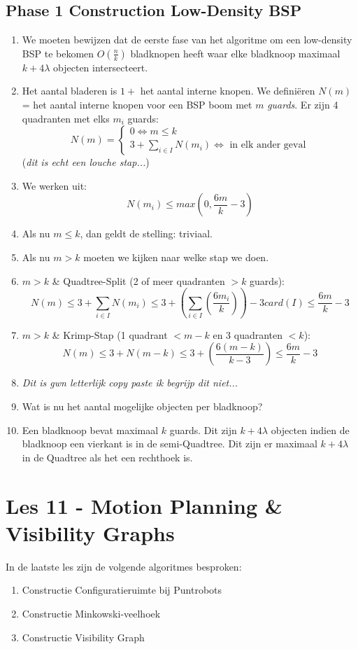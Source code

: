 \documentclass[12pt,a4paper]{article}
\begin{document}
		\subsection{Phase 1 Construction Low-Density BSP}
			\begin{enumerate}
				\item We moeten bewijzen dat de eerste fase van het algoritme om een low-density BSP te bekomen $O(\frac{n}{k})$ bladknopen heeft waar elke bladknoop maximaal $k + 4\lambda$ objecten intersecteert.
				
				\item Het aantal bladeren is $1 + $ het aantal interne knopen. We definiëren $N(m)$ = het aantal interne knopen voor een BSP boom met $m$ \emph{guards}. Er zijn 4 quadranten met elks $m_i$ guards:
				$$N(m) = \begin{cases}
					0 \iff m \leq k\\
					3 + \sum_{i \in I}N(m_i) \iff \text{ in elk ander geval}
				\end{cases}$$
				(\emph{dit is echt een louche stap...})
				\item We werken uit:
				$$N(m_i) \leq max(0, \frac{6m}{k} - 3)$$
				
				\item Als nu $m \leq k$, dan geldt de stelling: triviaal.
				\item Als nu $m > k$ moeten we kijken naar welke stap we doen.
				\item $m > k$ \& Quadtree-Split (2 of meer quadranten $> k$ guards):
				$$N(m) \leq 3 + \sum_{i \in I}N(m_i) \leq 3 + (\sum_{i \in I}(\frac{6m_i}{k})) - 3card(I) \leq \frac{6m}{k} - 3$$
				\item $m > k$ \& Krimp-Stap (1 quadrant $< m - k$ en 3 quadranten $< k$): 
				$$N(m) \leq 3 + N(m - k) \leq 3 + (\frac{6(m - k)}{k - 3}) \leq \frac{6m}{k} - 3$$
				\item \emph{Dit is gwn letterlijk copy paste ik begrijp dit niet...}
				\item Wat is nu het aantal mogelijke objecten per bladknoop?
				\item Een bladknoop bevat maximaal $k$ guards. Dit zijn $k + 4\lambda$ objecten indien de bladknoop een vierkant is in de semi-Quadtree. Dit zijn er maximaal $k + 4\lambda$ in de Quadtree als het een rechthoek is.
			\end{enumerate}
		
	\section{Les 11 - Motion Planning \& Visibility Graphs}
		In de laatste les zijn de volgende algoritmes besproken:
		\begin{enumerate}
			\item Constructie Configuratieruimte bij Puntrobots
			\item Constructie Minkowski-veelhoek
			\item Constructie Visibility Graph
		\end{enumerate}
	
\end{document}
